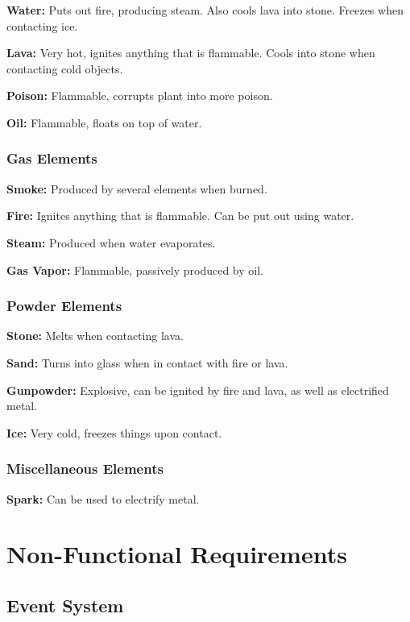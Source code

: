 \documentclass[12pt]{article}
\begin{document}
    \textbf{Water:} Puts out fire, producing steam. Also cools lava into stone.
    Freezes when contacting ice.

    \textbf{Lava:} Very hot, ignites anything that is flammable. Cools into
    stone when contacting cold objects.

    \textbf{Poison:} Flammable, corrupts plant into more poison.

    \textbf{Oil:} Flammable, floats on top of water.

    \subsubsection{Gas Elements}

    \textbf{Smoke:} Produced by several elements when burned.

    \textbf{Fire:} Ignites anything that is flammable. Can be put out using water.

    \textbf{Steam:} Produced when water evaporates.

    \textbf{Gas Vapor:} Flammable, passively produced by oil.

    \subsubsection{Powder Elements}

    \textbf{Stone:} Melts when contacting lava.

    \textbf{Sand:} Turns into glass when in contact with fire or lava.

    \textbf{Gunpowder:} Explosive, can be ignited by fire and lava, as well as
    electrified metal.

    \textbf{Ice:} Very cold, freezes things upon contact.

    \subsubsection{Miscellaneous Elements}

    \textbf{Spark:} Can be used to electrify metal.

    \section{Non-Functional Requirements}

    \subsection{Event System}
\end{document}
